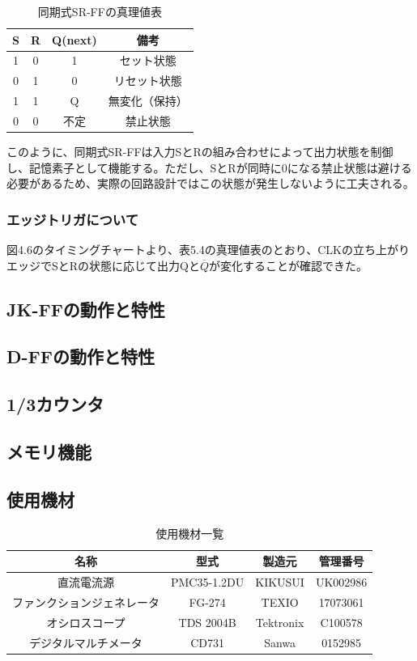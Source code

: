 \documentclass{jlreq}
\numberwithin{equation}{section}
\begin{document}
\begin{table}[H]
  \centering
  \caption{同期式SR-FFの真理値表}
  \begin{tabular}{|c|c|c|c|}
    \hline
    S & R & Q(next) & 備考 \\ \hline
    1 & 0 & 1 & セット状態 \\ \hline
    0 & 1 & 0 & リセット状態 \\ \hline
    1 & 1 & Q & 無変化（保持） \\ \hline
    0 & 0 & 不定 & 禁止状態 \\ \hline
  \end{tabular}
\end{table}

このように、同期式SR-FFは入力SとRの組み合わせによって出力状態を制御し、記憶素子として機能する。ただし、SとRが同時に0になる禁止状態は避ける必要があるため、実際の回路設計ではこの状態が発生しないように工夫される。

\subsubsection{エッジトリガについて}
図4.6のタイミングチャートより、表5.4の真理値表のとおり、CLKの立ち上がりエッジでSとRの状態に応じて出力Qと$\overline{Q}$が変化することが確認できた。

\subsection{JK-FFの動作と特性}

\subsection{D-FFの動作と特性}

\subsection{1/3カウンタ}

\subsection{メモリ機能}

\subsection{使用機材}
\begin{table}[H]
  \centering
  \caption{使用機材一覧}
  \begin{tabular}{|c|c|c|c|}
    \hline
    名称 & 型式 & 製造元 & 管理番号 \\ \hline
    直流電流源 & PMC35-1.2DU & KIKUSUI & UK002986 \\ \hline
    ファンクションジェネレータ & FG-274 & TEXIO & 17073061 \\ \hline
    オシロスコープ & TDS 2004B & Tektronix & C100578 \\ \hline
    デジタルマルチメータ & CD731 & Sanwa & 0152985 \\ \hline
  \end{tabular}
\end{table}
\end{document}
